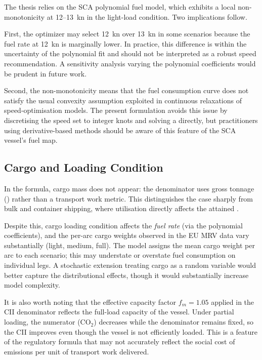 The thesis relies on the SCA polynomial fuel model, which exhibits a
local non-monotonicity at 12--13~kn in the light-load condition.  Two
implications follow.

First, the optimizer may select 12~kn over 13~kn in some scenarios
because the fuel rate at 12~kn is marginally lower.  In practice, this
difference is within the uncertainty of the polynomial fit and should not
be interpreted as a robust speed recommendation.  A sensitivity analysis
varying the polynomial coefficients would be prudent in future work.

Second, the non-monotonicity means that the fuel consumption curve does
not satisfy the usual convexity assumption exploited in continuous
relaxations of speed-optimisation models.  The present formulation
avoids this issue by discretising the speed set to integer knots and
solving a \MILP{} directly, but practitioners using derivative-based
methods should be aware of this feature of the SCA vessel's fuel map.

\subsection{Cargo and Loading Condition}
\label{sec:disc:cargo}

In the \RoRo{} \CII{} formula, cargo mass does not appear: the denominator
uses gross tonnage (\GT{}) rather than a transport work metric.  This
distinguishes the \RoRo{} case sharply from bulk and container shipping,
where utilisation directly affects the attained \CII{}.

Despite this, cargo loading condition affects the \emph{fuel rate}
(via the polynomial coefficients), and the per-arc cargo weights
observed in the EU MRV data vary substantially (light, medium, full).
The model assigns the mean cargo weight per arc to each scenario; this
may understate or overstate fuel consumption on individual legs.  A
stochastic extension treating cargo as a random variable would better
capture the distributional effects, though it would substantially
increase model complexity.

It is also worth noting that the effective capacity factor $f_m = 1.05$
applied in the CII denominator reflects the full-load capacity of the
vessel.  Under partial loading, the numerator (CO$_2$) decreases while
the denominator remains fixed, so the CII improves even though the
vessel is not efficiently loaded.  This is a feature of the regulatory
formula that may not accurately reflect the social cost of emissions per
unit of transport work delivered.

